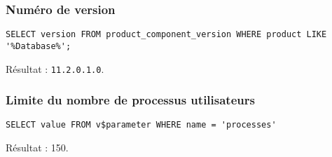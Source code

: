 \subsubsection{Numéro de version}

\begin{verbatim}
SELECT version FROM product_component_version WHERE product LIKE '%Database%';
\end{verbatim}

Résultat : \verb|11.2.0.1.0|.

\subsubsection{Limite du nombre de processus utilisateurs}

\begin{verbatim}
SELECT value FROM v$parameter WHERE name = 'processes'
\end{verbatim}

Résultat : 150.


